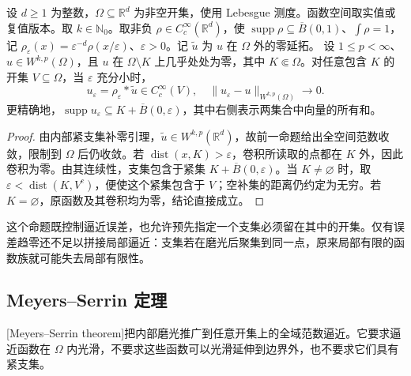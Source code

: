 \begin{proposition}\label{b1:prop:compact-sobolev-smooth-approximation}
设 \(d\geq1\) 为整数，\(\Omega\subseteq\mathbb R^d\) 为非空开集，使用 Lebesgue 测度。函数空间取实值或复值版本。取 \(k\in\mathbb N_0\)。取非负 \(\rho\in C_c^\infty(\mathbb R^d)\)，使 \(\operatorname{supp}\rho\subseteq\overline B(0,1)\)、\(\int\rho=1\)，记 \(\rho_\varepsilon(x)=\varepsilon^{-d}\rho(x/\varepsilon)\)、\(\varepsilon>0\)。记 \(\widetilde u\) 为 \(u\) 在 \(\Omega\) 外的零延拓。
设 \(1\leq p<\infty\)、\(u\in W^{k,p}(\Omega)\)，且 \(u\) 在 \(\Omega\setminus K\) 上几乎处处为零，其中 \(K\Subset\Omega\)。对任意包含 \(K\) 的开集 \(V\subseteq\Omega\)，当 \(\varepsilon\) 充分小时，
\[
 u_\varepsilon=\rho_\varepsilon*\widetilde u\in C_c^\infty(V),
 \quad
 \|u_\varepsilon-u\|_{W^{k,p}(\Omega)}\longrightarrow0.
\]
更精确地，\(\operatorname{supp}u_\varepsilon\subseteq K+\overline B(0,\varepsilon)\)，其中右侧表示两集合中向量的所有和。
\end{proposition}
\begin{proof}
由内部紧支集补零引理，\(\widetilde u\in W^{k,p}(\mathbb R^d)\)，故前一命题给出全空间范数收敛，限制到 \(\Omega\) 后仍收敛。若 \(\operatorname{dist}(x,K)>\varepsilon\)，卷积所读取的点都在 \(K\) 外，因此卷积为零。由其连续性，支集包含于紧集 \(K+\overline B(0,\varepsilon)\)。当 \(K\ne\varnothing\) 时，取
\(\varepsilon<\operatorname{dist}(K,V^c)\)，便使这个紧集包含于 \(V\)；空补集的距离仍约定为无穷。若 \(K=\varnothing\)，原函数及其卷积均为零，结论直接成立。
\end{proof}

这个命题既控制逼近误差，也允许预先指定一个支集必须留在其中的开集。仅有误差趋零还不足以拼接局部逼近：支集若在磨光后聚集到同一点，原来局部有限的函数族就可能失去局部有限性。

\subsection{Meyers–Serrin 定理}
\label{b1:subsec:220103}

[Meyers--Serrin theorem]把内部磨光推广到任意开集上的全域范数逼近。它要求逼近函数在 \(\Omega\) 内光滑，不要求这些函数可以光滑延伸到边界外，也不要求它们具有紧支集。

